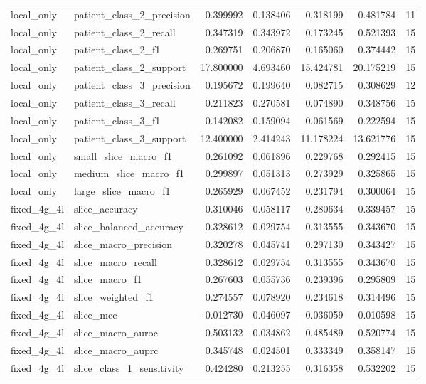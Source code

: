 \begin{tabular}{llrrrrr}
local_only & patient_class_2_precision & 0.399992 & 0.138406 & 0.318199 & 0.481784 & 11 \\
local_only & patient_class_2_recall & 0.347319 & 0.343972 & 0.173245 & 0.521393 & 15 \\
local_only & patient_class_2_f1 & 0.269751 & 0.206870 & 0.165060 & 0.374442 & 15 \\
local_only & patient_class_2_support & 17.800000 & 4.693460 & 15.424781 & 20.175219 & 15 \\
local_only & patient_class_3_precision & 0.195672 & 0.199640 & 0.082715 & 0.308629 & 12 \\
local_only & patient_class_3_recall & 0.211823 & 0.270581 & 0.074890 & 0.348756 & 15 \\
local_only & patient_class_3_f1 & 0.142082 & 0.159094 & 0.061569 & 0.222594 & 15 \\
local_only & patient_class_3_support & 12.400000 & 2.414243 & 11.178224 & 13.621776 & 15 \\
local_only & small_slice_macro_f1 & 0.261092 & 0.061896 & 0.229768 & 0.292415 & 15 \\
local_only & medium_slice_macro_f1 & 0.299897 & 0.051313 & 0.273929 & 0.325865 & 15 \\
local_only & large_slice_macro_f1 & 0.265929 & 0.067452 & 0.231794 & 0.300064 & 15 \\
fixed_4g_4l & slice_accuracy & 0.310046 & 0.058117 & 0.280634 & 0.339457 & 15 \\
fixed_4g_4l & slice_balanced_accuracy & 0.328612 & 0.029754 & 0.313555 & 0.343670 & 15 \\
fixed_4g_4l & slice_macro_precision & 0.320278 & 0.045741 & 0.297130 & 0.343427 & 15 \\
fixed_4g_4l & slice_macro_recall & 0.328612 & 0.029754 & 0.313555 & 0.343670 & 15 \\
fixed_4g_4l & slice_macro_f1 & 0.267603 & 0.055736 & 0.239396 & 0.295809 & 15 \\
fixed_4g_4l & slice_weighted_f1 & 0.274557 & 0.078920 & 0.234618 & 0.314496 & 15 \\
fixed_4g_4l & slice_mcc & -0.012730 & 0.046097 & -0.036059 & 0.010598 & 15 \\
fixed_4g_4l & slice_macro_auroc & 0.503132 & 0.034862 & 0.485489 & 0.520774 & 15 \\
fixed_4g_4l & slice_macro_auprc & 0.345748 & 0.024501 & 0.333349 & 0.358147 & 15 \\
fixed_4g_4l & slice_class_1_sensitivity & 0.424280 & 0.213255 & 0.316358 & 0.532202 & 15 \\

\end{tabular}
